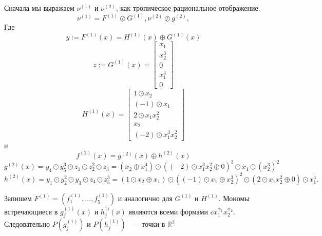 \documentclass[russian]{lecture-notes}
\begin{document}
	Сначала мы выражаем $\nu^{(1)}$ и $\nu^{(2)}$, как тропическое рациональное отображение.
	\[
	\nu^{(1)}=F^{(1)}\oslash G^{(1)} , \nu^{(2)} \oslash g^{(2)},
	\]
	Где 
	\[
		y:=F^{(1)}(x) = H^{(1)}(x) \oplus G^{(1)}(x)
	\]
	\[
		z:=G^{(1)}(x) = \begin{bmatrix}
		x_1\\
		x_2^3\\
		0\\
		x_1^4\\
		0
		\end{bmatrix}
	\]
	\[
		H^{(1)}(x) = \begin{bmatrix}
		1\odot x_2\\
		(-1)\odot x_1\\
		2 \odot x_1x^2_2\\
		x_2\\
		(-2)\odot x_1^3 x^2_2
		\end{bmatrix}
	\]
	и 
	\[
		f^{(2)}(x) = g^{(2)}(x) \oplus h^{(2)}(x)
	\]
	\[
		g^{(2)}(x) = y_4 \odot y_5^3 \odot z_1 \odot z_2^2 \odot z_3 = (x_2 \oplus x^4_1) \odot ((-2)\odot x^3_1x^2_2 \oplus 0)^3 \odot x_1 \odot (x_2^3)^2
	\]
	\[
		h^{(2)}(x) = y_1 \odot y_2^2 \odot y_3 \odot z_4 \odot z_5^3 = (1 \odot x_2 \oplus x_1)\odot ((-1)\odot x_1 \oplus x^3_2)^2 \odot (2 \odot x_1x_2^2 \oplus 0) \odot x_1^4.
	\]
	\begin{figure}[h]
	
	\end{figure}
	Запишем $F^{(1)} = (f_1^{(1)}, \dots, f_5^{(1)})$ и аналогично для $G^{(1)}$ и $H^{(1)}$. Мономы встречающиеся в $g_j^{(1)}(x)$ и $h_j^{1)}(x)$ являются всеми формами $cx_1^{\alpha_1}x_2^{\alpha_2}$. Следовательно $P(g_j^{(1)})$ и $P(h_j^{(1)})$ ~--- точки в $\mathbb{R}^3$
	
\end{document}
